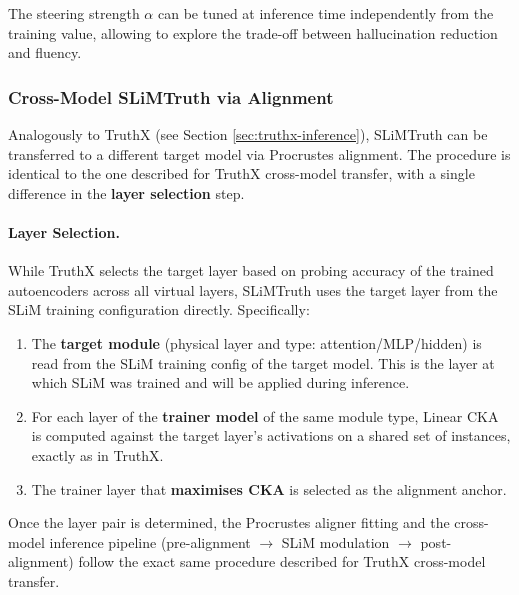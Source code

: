 The steering strength $\alpha$ can be tuned at inference time independently from the training value, allowing to explore the trade-off between hallucination reduction and fluency.


\subsubsection{Cross-Model SLiMTruth via Alignment}

Analogously to TruthX (see Section \ref{sec:truthx-inference}), SLiMTruth can be transferred to a different target model via Procrustes alignment. The procedure is identical to the one described for TruthX cross-model transfer, with a single difference in the \textbf{layer selection} step.

\paragraph{Layer Selection.}
While TruthX selects the target layer based on probing accuracy of the trained autoencoders across all virtual layers, SLiMTruth uses the target layer from the SLiM training configuration directly. Specifically:
\begin{enumerate}
    \item The \textbf{target module} (physical layer and type: attention/MLP/hidden) is read from the SLiM training config of the target model. This is the layer at which SLiM was trained and will be applied during inference.
    \item For each layer of the \textbf{trainer model} of the same module type, Linear CKA is computed against the target layer's activations on a shared set of instances, exactly as in TruthX.
    \item The trainer layer that \textbf{maximises CKA} is selected as the alignment anchor.
\end{enumerate}

\noindent Once the layer pair is determined, the Procrustes aligner fitting and the cross-model inference pipeline (pre-alignment $\to$ SLiM modulation $\to$ post-alignment) follow the exact same procedure described for TruthX cross-model transfer.

